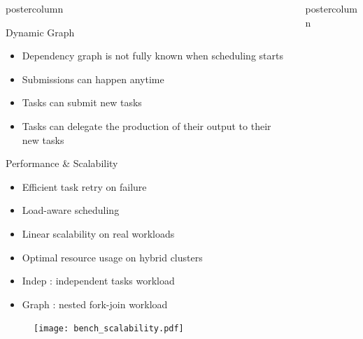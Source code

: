 \begin{frame}[fragile]
\begin{columns}[T]
\begin{column}{.49\textwidth}
\begin{beamercolorbox}[center,wd=\textwidth]{postercolumn}
\begin{minipage}[T]{.96\textwidth}

            \begin{block}{Dynamic Graph}
            \begin{itemize}
                \item Dependency graph is not fully known when scheduling starts
                \item Submissions can happen anytime
                \item Tasks can submit new tasks
                \item Tasks can delegate the production of their output to their new tasks
            \end{itemize}
            \centering
            \vspace{1cm}
            \vfill
            
            \end{block}

            \begin{block}{Performance \& Scalability}
            \begin{itemize}
                \item Efficient task retry on failure
                \item Load-aware scheduling
                \item Linear scalability on real workloads
                \item Optimal resource usage on hybrid clusters
                \item Indep : independent tasks workload
                \item Graph : nested fork-join workload
            \end{itemize}
            \begin{figure}
              \centering
              \texttt{[image: bench\_scalability.pdf]}
            \end{figure}
            \end{block}

        \end{minipage}
      \end{beamercolorbox}
    \end{column}
    \begin{column}{.49\textwidth}
      \begin{beamercolorbox}[center,wd=\textwidth]{postercolumn}
        \begin{minipage}[T]{.96\textwidth}
            

\end{minipage}
\end{beamercolorbox}
\end{column}
\end{columns}
\end{frame}
